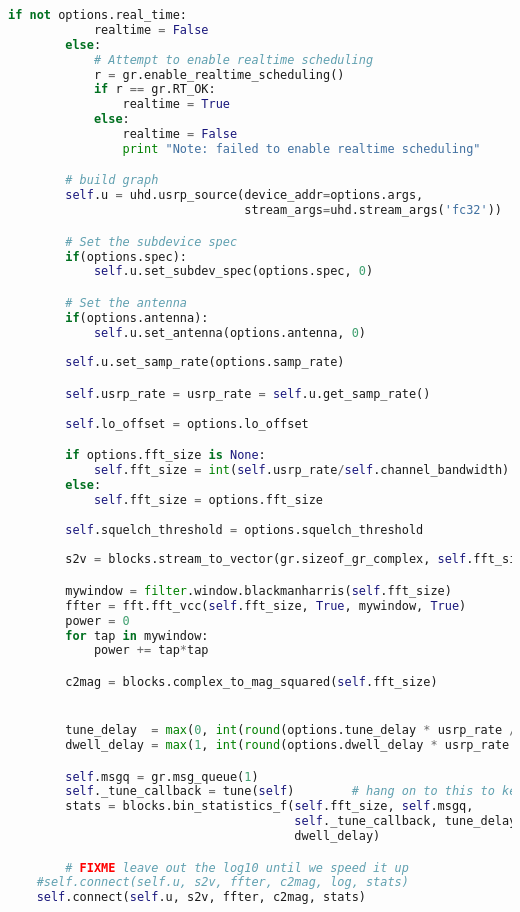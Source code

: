 \begin{lstlisting}[language=Python]
        if not options.real_time:
            realtime = False
        else:
            # Attempt to enable realtime scheduling
            r = gr.enable_realtime_scheduling()
            if r == gr.RT_OK:
                realtime = True
            else:
                realtime = False
                print "Note: failed to enable realtime scheduling"

        # build graph
        self.u = uhd.usrp_source(device_addr=options.args,
                                 stream_args=uhd.stream_args('fc32'))

        # Set the subdevice spec
        if(options.spec):
            self.u.set_subdev_spec(options.spec, 0)

        # Set the antenna
        if(options.antenna):
            self.u.set_antenna(options.antenna, 0)
        
        self.u.set_samp_rate(options.samp_rate)

        self.usrp_rate = usrp_rate = self.u.get_samp_rate()
        
        self.lo_offset = options.lo_offset

        if options.fft_size is None:
            self.fft_size = int(self.usrp_rate/self.channel_bandwidth)
        else:
            self.fft_size = options.fft_size
        
        self.squelch_threshold = options.squelch_threshold
        
        s2v = blocks.stream_to_vector(gr.sizeof_gr_complex, self.fft_size)

        mywindow = filter.window.blackmanharris(self.fft_size)
        ffter = fft.fft_vcc(self.fft_size, True, mywindow, True)
        power = 0
        for tap in mywindow:
            power += tap*tap

        c2mag = blocks.complex_to_mag_squared(self.fft_size)


        tune_delay  = max(0, int(round(options.tune_delay * usrp_rate / self.fft_size)))  # in fft_frames
        dwell_delay = max(1, int(round(options.dwell_delay * usrp_rate / self.fft_size))) # in fft_frames

        self.msgq = gr.msg_queue(1)
        self._tune_callback = tune(self)        # hang on to this to keep it from being GC'd
        stats = blocks.bin_statistics_f(self.fft_size, self.msgq,
                                        self._tune_callback, tune_delay,
                                        dwell_delay)

        # FIXME leave out the log10 until we speed it up
    #self.connect(self.u, s2v, ffter, c2mag, log, stats)
    self.connect(self.u, s2v, ffter, c2mag, stats)


\end{lstlisting}
